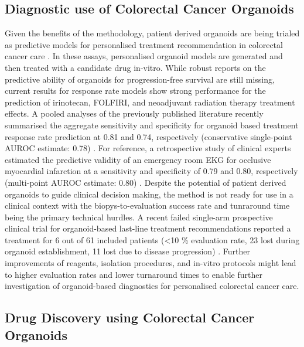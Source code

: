 \begin{flushleft}
\subsection{Diagnostic use of Colorectal Cancer Organoids}

Given the benefits of the methodology, patient derived organoids are being trialed as predictive models for personalised treatment recommendation in colorectal cancer care \cite{VanDeWetering2015, Vlachogiannis2018, ganeshRectalCancerOrganoid2019a, ooftPatientderivedOrganoidsCan2019a, yaoPatientDerivedOrganoidsPredict2020a}. In these assays, personalised organoid models are generated and then treated with a candidate drug in-vitro. While robust reports on the predictive ability of organoids for progression-free survival are still missing, current results for response rate models show strong performance for the prediction of irinotecan, FOLFIRI, and neoadjuvant radiation therapy treatment effects. A pooled analyses of the previously published literature recently summarised the aggregate sensitivity and specificity for organoid based treatment response rate prediction at 0.81 and 0.74, respectively (conservative single-point AUROC estimate: 0.78) \cite{wensinkPatientderivedOrganoidsPredictive2021, zhangNoteROCAnalysis2005}. For reference, a retrospective study of clinical experts estimated the predictive validity of an emergency room EKG for occlusive myocardial infarction at a sensitivity and specificity of 0.79 and 0.80, respectively (multi-point AUROC estimate: 0.80) \cite{al-zaitiMachineLearningECG2023}. Despite the potential of patient derived organoids to guide clinical decision making, the method is not ready for use in a clinical context with the biopys-to-evaluation success rate and tunraround time being the primary technical hurdles. A recent failed single-arm prospective clinical trial for organoid-based last-line treatment recommendations reported a treatment for 6 out of 61 included patients (<10 \% evaluation rate, 23 lost during organoid establishment, 11 lost due to disease progression) \cite{ooftProspectiveExperimentalTreatment2021}. Further improvements of reagents, isolation procedures, and in-vitro protocols might lead to higher evaluation rates and lower turnaround times to enable further investigation of organoid-based diagnostics for personalised colorectal cancer care. \par

\subsection{Drug Discovery using Colorectal Cancer Organoids}


\end{flushleft}
